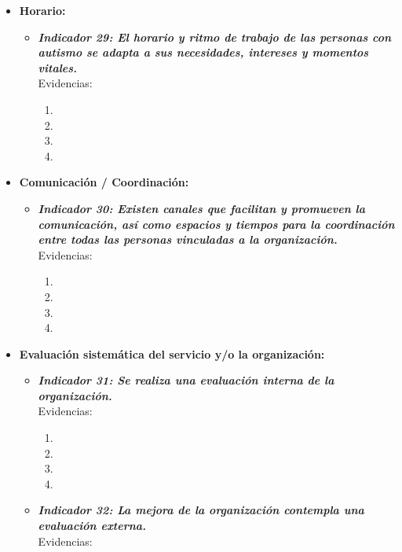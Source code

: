 \begin{itemize}
\begin{itemize}
		\item \textbf{Horario:}
		\begin{itemize}
			\item \textbf{\textit{Indicador 29: El horario y ritmo de trabajo de las personas con autismo se adapta a sus necesidades, intereses y momentos vitales.}}\\Evidencias:
			
			\begin{enumerate}
				\item 
				\item 
				\item 
				\item 
			\end{enumerate}
			
		\end{itemize}
		\item \textbf{Comunicación / Coordinación:}
		\begin{itemize}
			\item \textbf{\textit{Indicador 30: Existen canales que facilitan y promueven la comunicación, así como espacios y tiempos para la coordinación entre todas las personas vinculadas a la organización.}}\\Evidencias:
			
			\begin{enumerate}
				\item 
				\item 
				\item 
				\item 
			\end{enumerate}
			
		\end{itemize}
		
		\item \textbf{Evaluación sistemática del servicio y/o la organización: }
		\begin{itemize}
			\item \textbf{\textit{Indicador 31: Se realiza una evaluación interna de la organización.}}\\Evidencias:
			
			\begin{enumerate}
				\item 
				\item 
				\item 
				\item 
			\end{enumerate}

			\item \textbf{\textit{Indicador 32: La mejora de la organización contempla una evaluación externa.}}\\Evidencias:
			

\end{itemize}
\end{itemize}
\end{itemize}
